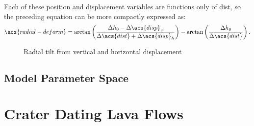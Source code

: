 Each of these position and displacement variables are functions only of \acs{dist}, so the preceding equation can be more compactly expressed as:
\begin{equation}
    \acs{radial-deform} = 
    \arctan\left(\dfrac{\Delta h_0-\Delta\acs{disp}_v}{\Delta\acs{dist}+\Delta\acs{disp}_h}\right) - \arctan\left(\frac{\Delta h_0}{\Delta\acs{dist}}\right).
\end{equation}

\begin{figure}
    
    \caption[]{Radial tilt from vertical and horizontal displacement}
    \label{fig:tilt-from-disp}
\end{figure}

\subsection{Model Parameter Space}

\section{Crater Dating Lava Flows}

